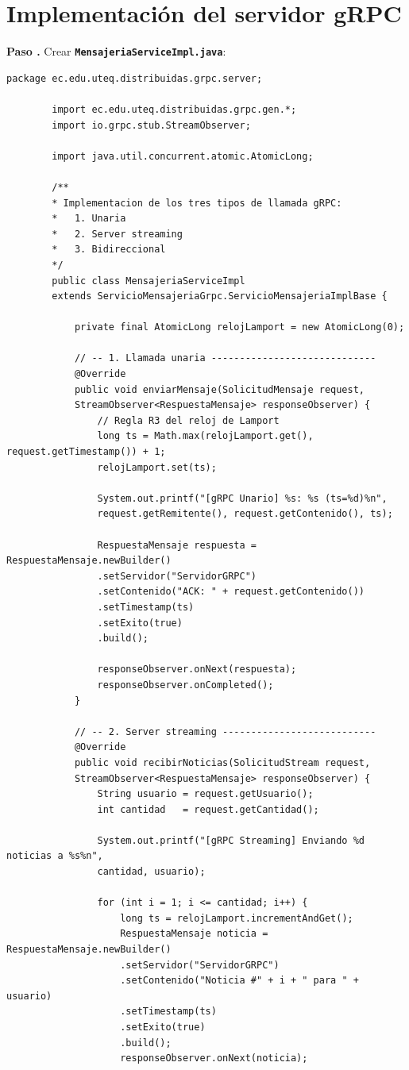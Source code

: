 \documentclass[12pt, a4paper, openany]{book}
\newcounter{paso}[section]
\newcommand{\paso}[1]{%
	\stepcounter{paso}%
	\medskip\noindent
	\begin{tcolorbox}[enhanced, colback=white, colframe=practiceBlue,
		boxrule=0.8pt, arc=3pt, left=6pt, right=6pt, top=4pt, bottom=4pt,
		before upper={\noindent}]
		\textcolor{practiceBlue}{\textbf{Paso \arabic{paso}.}} #1
	\end{tcolorbox}%
}
\newcommand{\archivo}[1]{\texttt{\textbf{#1}}}
\begin{document}
	\section{Implementación del servidor gRPC}
	
	\paso{Crear \archivo{MensajeriaServiceImpl.java}:}
	
	\begin{lstlisting}[style=JavaStyle, caption={MensajeriaServiceImpl.java --- Implementación de los tres tipos de llamada}]
		package ec.edu.uteq.distribuidas.grpc.server;
		
		import ec.edu.uteq.distribuidas.grpc.gen.*;
		import io.grpc.stub.StreamObserver;
		
		import java.util.concurrent.atomic.AtomicLong;
		
		/**
		* Implementacion de los tres tipos de llamada gRPC:
		*   1. Unaria
		*   2. Server streaming
		*   3. Bidireccional
		*/
		public class MensajeriaServiceImpl
		extends ServicioMensajeriaGrpc.ServicioMensajeriaImplBase {
			
			private final AtomicLong relojLamport = new AtomicLong(0);
			
			// -- 1. Llamada unaria -----------------------------
			@Override
			public void enviarMensaje(SolicitudMensaje request,
			StreamObserver<RespuestaMensaje> responseObserver) {
				// Regla R3 del reloj de Lamport
				long ts = Math.max(relojLamport.get(), request.getTimestamp()) + 1;
				relojLamport.set(ts);
				
				System.out.printf("[gRPC Unario] %s: %s (ts=%d)%n",
				request.getRemitente(), request.getContenido(), ts);
				
				RespuestaMensaje respuesta = RespuestaMensaje.newBuilder()
				.setServidor("ServidorGRPC")
				.setContenido("ACK: " + request.getContenido())
				.setTimestamp(ts)
				.setExito(true)
				.build();
				
				responseObserver.onNext(respuesta);
				responseObserver.onCompleted();
			}
			
			// -- 2. Server streaming ---------------------------
			@Override
			public void recibirNoticias(SolicitudStream request,
			StreamObserver<RespuestaMensaje> responseObserver) {
				String usuario = request.getUsuario();
				int cantidad   = request.getCantidad();
				
				System.out.printf("[gRPC Streaming] Enviando %d noticias a %s%n",
				cantidad, usuario);
				
				for (int i = 1; i <= cantidad; i++) {
					long ts = relojLamport.incrementAndGet();
					RespuestaMensaje noticia = RespuestaMensaje.newBuilder()
					.setServidor("ServidorGRPC")
					.setContenido("Noticia #" + i + " para " + usuario)
					.setTimestamp(ts)
					.setExito(true)
					.build();
					responseObserver.onNext(noticia);
					

\end{lstlisting}
\end{document}
